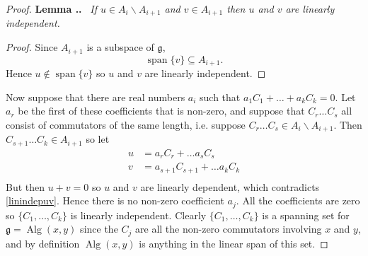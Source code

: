 \documentclass[honours]{UNSWthesis}
\newcommand{\g}{\mathfrak{g}}
\newcommand{\1}{\mathbf{e}_{1}}
\newcommand{\2}{\mathbf{e}_{3}}
\newcommand{\3}{\mathbf{e}_{3}}
\DeclareMathOperator{\alg}{Alg}
\DeclareMathOperator{\spn}{span}
\newcounter{Item}[section]
\newenvironment{Lemma}{\medskip
                            \refstepcounter{Item}
                            \noindent
                           {\bf Lemma \thesection.\theItem.}\ %
                            \begingroup \sl}
                           {\endgroup\medskip}
\begin{document}
\begin{proof}
\begin{Lemma}\label{linindepuv}
If $u \in A_{i}\backslash A_{i+1} $ and $v \in A_{i+1}$ then $u$ and $v$ are linearly independent.
\end{Lemma}
\begin{proof}
Since $A_{i+1}$ is a subspace of $\g$, 
\[
\spn \{ v\} \subseteq A_{i+1}.
\]
Hence $u \notin \spn \{ v\}$ so $u$ and $v$ are linearly independent.
\end{proof}

Now suppose that there are real numbers $a_{i}$ such that $a_{1}C_{1}+\ldots + a_{k}C_{k}=0$. Let $a_{r}$ be the first of these coefficients that is non-zero, and suppose that $C_{r} \ldots C_{s}$ all consist of commutators of the same length, i.e. suppose $C_{r} \ldots C_{s} \in A_{i}\backslash A_{i+1}$. Then $C_{s+1} \ldots C_{k} \in A_{i+1}$ so let
\begin{align*}
u &=a_{r}C_{r}+ \ldots a_{s}C_{s} \\
v &=a_{s+1}C_{s+1} + \ldots a_{k}C_{k} \\
\end{align*}
But then $u+v=0$ so $u$ and $v$ are linearly dependent, which contradicts \ref{linindepuv}. Hence there is no non-zero coefficient $a_{j}$. All the coefficients are zero so $\{ C_{1},\ldots,C_{k} \}$ is linearly independent.
\newline
Clearly $\{ C_{1},\ldots,C_{k} \}$ is a spanning set for $\g=\alg(x,y)$ since the $C_{j}$ are all the non-zero commutators involving $x$ and $y$, and by definition $\alg(x,y)$ is anything in the linear span of this set.

\end{proof}
\end{document}
